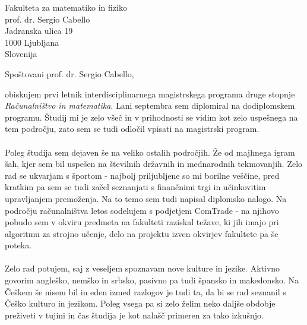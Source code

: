 \documentclass[a4paper]{scrlttr2}
\begin{document}
 
\begin{letter}{Fakulteta za matematiko in fiziko\\ prof. dr. Sergio Cabello \\ Jadranska ulica 19 \\ 1000 Ljubljana \\ Slovenija}
 


\opening{Spoštovani prof. dr. Sergio Cabello,}
obiskujem prvi letnik interdisciplinarnega magistrskega programa druge stopnje \textit{Računalništvo in matematika}. Lani septembra sem diplomiral na dodiplomskem programu. Študij mi je zelo všeč in v prihodnosti se vidim kot zelo uspešnega na tem področju, zato sem se tudi odločil vpisati na magistrski program.
\\
\\
Poleg študija sem dejaven še na veliko ostalih področjih. Že od majhnega igram šah, kjer sem bil uspešen na številnih državnih in mednarodnih tekmovanjih. Zelo rad se ukvarjam s športom - najbolj priljubljene so mi borilne veščine, pred kratkim pa sem  se tudi začel seznanjati s finančnimi trgi in učinkovitim upravljanjem premoženja. Na to temo sem tudi napisal diplomsko nalogo. Na področju računalništva letos sodelujem s podjetjem ComTrade - na njihovo pobudo sem v okviru predmeta na fakulteti raziskal težave, ki jih imajo pri algoritmu za strojno učenje, delo na projektu izven okvirjev fakultete pa še poteka.
\\
\\
Zelo rad potujem, saj z veseljem spoznavam nove kulture in jezike. Aktivno govorim angleško, nemško in srbsko, pasivno pa tudi špansko in makedonsko. Na Češkem še nisem bil in eden izmed razlogov je tudi ta, da bi se rad seznanil s Češko kulturo in jezikom. Poleg vsega pa si zelo želim neko daljše obdobje preživeti v tujini in čas študija je kot nalašč primeren za tako izkušnjo.

\pagebreak


\end{letter}
\end{document}
